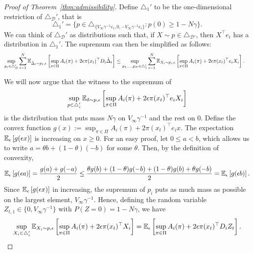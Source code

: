 \documentclass[11pt]{article}
\begin{document}
\begin{proof}[Proof of Theorem~\ref{thm:admissibility}]
Define $\triangle_1'$ to be the one-dimensional restriction of $\triangle_{\mathcal D}'$, that is
\[
  \triangle_1' = \{ p \in \triangle_{\{V_\infty \gamma^{-1} e_i,0,-V_\infty \gamma^{-1} e_i\}}: p(0)\geq 1-N\gamma\}.
\]
 We can think of $\triangle_{\mathcal D}'$ as distributions such that, if $X\sim p\in\triangle_{\mathcal D'}$, then $X^\top e_i$ has a distribution in $\triangle_1'$. The supremum can then be simplified as follows:
\begin{align*}
  \sup_{p_t\in\triangle_{\mathcal D}'}
    \sum_{i=1}^N \mathbb E_{\hat\Delta_t\sim p_t,\epsilon}\left[
        \sup_{\pi\in\Pi} A_i(\pi)+
        2\epsilon\pi(x_t)^\top D_i \hat\Delta_t
  \right]
  &\leq
      \sup_{p_1,\ldots,p_N \in\triangle_1'}
    \sum_{i=1}^N \mathbb E_{X_i\sim p_i,\epsilon}\left[
        \sup_{\pi\in\Pi} A_i(\pi)+
        2\epsilon\pi(x_t)^\top e_i X_i
    \right].
\end{align*}

We will now argue that the witness to the supremum of 
\begin{align*}
    \sup_{p\in\triangle_i'}
  \mathbb E_{\delta\sim p,\epsilon}\left[
        \sup_{\pi\in\Pi} A_i(\pi)+
        2\epsilon\pi(x_t)^\top e_i X_i
        \right]
\end{align*}
is the distribution that puts mass $N\gamma$ on $V_\infty\gamma^{-1}$ and the rest on $0$.
Define the convex function 
$g(x) :=  \sup_{\pi\in\Pi} A_i(\pi)+ 2\pi(x_t)^\top e_i x$. The expectation $\mathbb E_{\epsilon}\left[ g(\epsilon x)\right]$ is increasing on $x\geq 0$. For an easy proof, let $0\leq a<b$, which allows us to write $a = \theta b + (1-\theta)(-b)$ for some $\theta$. Then, by the definition of convexity,
 \begin{align*}
   \mathbb E_{\epsilon}\left[ g(\epsilon a) \right]
   = 
   \frac{g(a)+g(-a)}{2}
   \leq
   \frac{\theta g(b)+(1-\theta)g(-b)
   +(1-\theta) g(b)+\theta g(-b)
   }{2}
   =
   \mathbb E_{\epsilon}\left[ g(\epsilon b) \right].
 \end{align*}
 Since $\mathbb E_{\epsilon}\left[ g(\epsilon x)\right]$ in increasing, the supremum of $p_i$ puts as much mass as possible on the largest element, $V_\infty\gamma^{-1}$. Hence, defining the random variable $Z_{t,1} \in \{0,V_\infty\gamma^{-1}\}$ with $P(Z = 0) = 1-N\gamma$, we have
 \begin{align*}
    \sup_{X_i\in\triangle_i'}
  \mathbb E_{X_i\sim p,\epsilon}\left[
        \sup_{\pi\in\Pi} A_i(\pi)+
        2\epsilon\pi(x_t)^\top X_i
   \right]
   =
  \mathbb E_{\epsilon}\left[
        \sup_{\pi\in\Pi} A_i(\pi)+
        2\epsilon\pi(x_t)^\top D_i Z_t
        \right].
\end{align*}


\end{proof}
\end{document}
